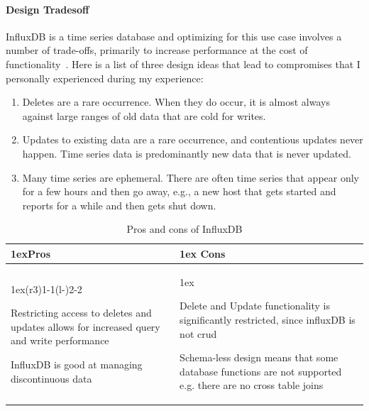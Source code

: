\paragraph{Design Tradesoff}
InfluxDB is a time series database and optimizing for this use case involves a number of trade-offs, primarily to increase performance at the cost of functionality~\cite{Misc:influx_docs}. Here is a list of three design ideas that lead to compromises that I personally experienced during my experience:

\begin{enumerate}
    \item Deletes are a rare occurrence. When they do occur, it is almost always against large ranges of old data that are cold for writes.
    \item Updates to existing data are a rare occurrence, and contentious updates never happen. Time series data is predominantly new data that is never updated.
    \item Many time series are ephemeral. There are often time series that appear only for a few hours and then go away, e.g., a new host that gets started and reports for a while and then gets shut down.
\end{enumerate}


\begin{table}[ht]
    \begin{tabularx}{\textwidth}{>{\parskip1ex}X@{\kern4\tabcolsep}>{\parskip1ex}X}
        \toprule
        \hfil\bfseries Pros
         &
        \hfil\bfseries Cons
        \\\cmidrule(r{3\tabcolsep}){1-1}\cmidrule(l{-\tabcolsep}){2-2}

        Restricting access to deletes and updates allows for increased query and write performance\par
        InfluxDB is good at managing discontinuous data\par

         &

        Delete and Update functionality is significantly restricted, since influxDB is not \acs{crud} \par
        Schema-less design means that some database functions are not supported e.g. there are no cross table joins\par
        \\\bottomrule
    \end{tabularx}
    \caption{Pros and cons of InfluxDB}
\end{table}

